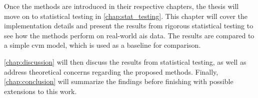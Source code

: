 Once the methods are introduced in their respective chapters, the thesis will move on to statistical testing in \cref{chap:stat_testing}. This chapter will cover the implementation details and present the results from rigorous statistical testing to see how the methods perform on real-world \acrshort{ais} data. The results are compared to a simple \acrshort{cvm} model, which is used as a baseline for comparison. 

\cref{chap:discussion} will then discuss the results from statistical testing, as well as address theoretical concerns regarding the proposed methods. 
Finally, \cref{chap:conclusion} will summarize the findings before finishing with possible extensions to this work.



